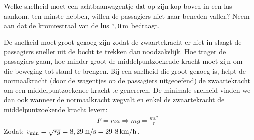 \item 
\begin{minipage}[t]{0.5\textwidth}
Welke snelheid moet een achtbaanwagentje dat op zijn kop boven in een lus aankomt ten minste hebben, willen de passagiers niet naar beneden vallen? Neem aan dat de kromtestraal van de lus $7,0\rm\,m$ bedraagt.
\end{minipage}
\hspace{5mm}
\begin{minipage}[t]{0.45\textwidth}
\end{minipage}
\begin{oplossing}
De snelheid moet groot genoeg zijn zodat de zwaartekracht er niet in slaagt de passagiers sneller uit de bocht te trekken dan noodzakelijk. Hoe trager de passagiers gaan, hoe minder groot de middelpuntzoekende kracht moet zijn om die beweging tot stand te brengen. 
\newline
Bij een snelheid die groot genoeg is, helpt de normaalkracht (door de wagentjes op de passagiers uitgeoefend) de zwaartekracht om een middelpuntzoekende kracht te genereren. De minimale snelheid vinden we dan ook wanneer de normaalkracht wegvalt en enkel de zwaartekracht de middelpuntzoekende kracht levert:
\begin{eqnarray*}
		F=ma\Rightarrow mg=\frac{mv^2}{r}
\end{eqnarray*}
Zodat:
$v_{\rm min}=\sqrt{rg}=8,29\rm\,m/s=29,8\rm\,km/h$.
\end{oplossing}